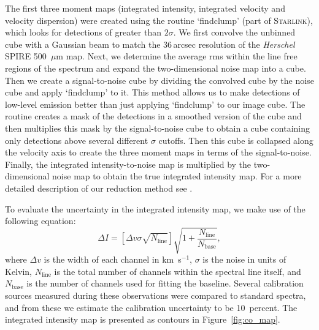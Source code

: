 \documentclass[useAMS,usenatbib,usegraphicx]{mn2e}
\begin{document}
The first three moment maps (integrated intensity, integrated velocity and velocity dispersion) were created using the routine `findclump' (part of \textsc{Starlink}), which looks for detections of greater than $2\sigma$.  We first convolve the unbinned cube with a Gaussian beam to match the 36\,arcsec resolution of the \emph{Herschel} SPIRE 500~$\mu$m map.  Next, we determine the average rms within the line free regions of the spectrum and expand the two-dimensional noise map into a cube.  Then we create a signal-to-noise cube by dividing the convolved cube by the noise cube and apply `findclump' to it.  This method allows us to make detections of low-level emission better than just applying `findclump' to our image cube.  The routine creates a mask of the detections in a smoothed version of the cube and then multiplies this mask by the signal-to-noise cube to obtain a cube containing only detections above several different $\sigma$ cutoffs.  Then this cube is collapsed along the velocity axis to create the three moment maps in terms of the signal-to-noise.  Finally, the integrated intensity-to-noise map is multiplied by the two-dimensional noise map to obtain the true integrated intensity map.  For a more detailed description of our reduction method see \citet{2010ApJ...714..571W}.

To evaluate the uncertainty in the integrated intensity map, we make use of the following equation:
\begin{equation}
 \Delta I = \left[ \Delta v \sigma \sqrt{N_{\mathrm{line}}} \right] \sqrt{1 + \frac{N_{\mathrm{line}}}{N_{\mathrm{base}}}},
\end{equation}
where $\Delta v$ is the width of each channel in km~s$^{-1}$, $\sigma$ is the noise in units of Kelvin, $N_{\mathrm{line}}$ is the total number of channels within the spectral line itself, and $N_{\mathrm{base}}$ is the number of channels used for fitting the baseline.  Several calibration sources measured during these observations were compared to standard spectra, and from these we estimate the calibration uncertainty to be 10~percent.  The integrated intensity map is presented as contours in Figure~\ref{fig:co_map}.
\end{document}
